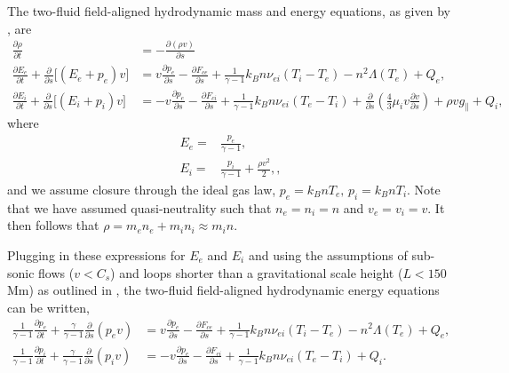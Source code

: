 \documentclass[apj]{emulateapj}
\begin{document}
	\section{}
	\label{appendix}
	\par The two-fluid field-aligned hydrodynamic mass and energy equations, as given by \citet{bradshaw_influence_2013}, are
	\begin{align}
		\frac{\partial\rho}{\partial t} &= -\frac{\partial(\rho v)}{\partial s} \label{eq:1dmass} \\[0.5em]
		\frac{\partial E_e}{\partial t} + \frac{\partial}{\partial s} \lbrack(E_e+p_e)v\rbrack &= v\frac{\partial p_e}{\partial s} - \frac{\partial F_{ce}}{\partial s} + \frac{1}{\gamma - 1}k_Bn\nu_{ei}(T_i-T_e) -n^2\Lambda(T_e)+Q_{e} , \label{eq:1denergy_e} \\[0.5em]
		\frac{\partial E_i}{\partial t} + \frac{\partial }{\partial s}\lbrack(E_i+p_i)v\rbrack &= -v\frac{\partial p_e}{\partial s} - \frac{\partial F_{ci}}{\partial s} + \frac{1}{\gamma - 1}k_Bn\nu_{ei}(T_e-T_i) + \frac{\partial}{\partial s}\left(\frac{4}{3}\mu_iv\frac{\partial v}{\partial s}\right) +\rho v g_{\parallel} + Q_{i},\label{eq:1denergy_i}
	\end{align}
	where
	\begin{align}
		E_e =& \frac{p_e}{\gamma - 1} \label{eq:ee_closure}, \\[0.5em]
		E_i =& \frac{p_i}{\gamma - 1} + \frac{\rho v^2}{2}, \label{eq:ei_closure},
	\end{align}
	and we assume closure through the ideal gas law, $p_e=k_BnT_e,\,p_i=k_BnT_i$. Note that we have assumed quasi-neutrality such that $n_e=n_i=n$ and $v_e=v_i=v$. It then follows that $\rho=m_en_e+m_in_i\approx m_in$. 
	\par Plugging in these expressions for $E_e$ and $E_i$ and using the assumptions of sub-sonic flows ($v<C_s$) and loops shorter than a gravitational scale height ($L<150$ Mm) as outlined in \citet{klimchuk_highly_2008}, the two-fluid field-aligned hydrodynamic energy equations can be written,
	\begin{align}
		\frac{1}{\gamma - 1}\frac{\partial p_e}{\partial t} + \frac{\gamma}{\gamma - 1}\frac{\partial}{\partial s}(p_ev) &= v\frac{\partial p_e}{\partial s} - \frac{\partial F_{ce}}{\partial s} + \frac{1}{\gamma - 1}k_Bn\nu_{ei}(T_i-T_e) -n^2\Lambda(T_e)+Q_{e}, \label{eq:1denergy_e_simp} \\[0.5em]
		\frac{1}{\gamma - 1}\frac{\partial p_i}{\partial t} + \frac{\gamma}{\gamma - 1}\frac{\partial }{\partial s}(p_iv)&= -v\frac{\partial p_e}{\partial s} - \frac{\partial F_{ci}}{\partial s} + \frac{1}{\gamma - 1}k_Bn\nu_{ei}(T_e-T_i) + Q_{i}. \label{eq:1denergy_i_simp}
	\end{align}
\end{document}
